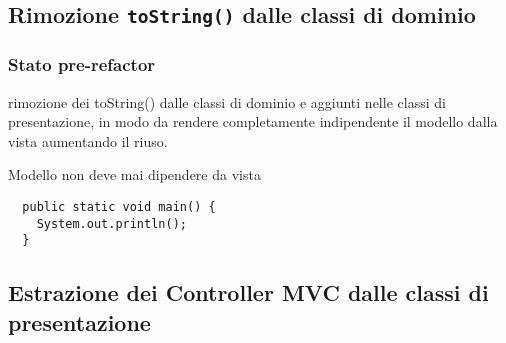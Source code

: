 
\subsection{Rimozione \texttt{toString()} dalle classi di dominio}
\begin{frame}[fragile]
  \frametitle{Stato pre-refactor}
  rimozione dei toString() dalle classi di dominio e aggiunti nelle classi di presentazione, in modo da
  rendere completamente indipendente il modello dalla vista aumentando il riuso.\par
  Modello non deve mai dipendere da vista
  \begin{lstlisting}
  public static void main() {
    System.out.println();
  }
  \end{lstlisting}
\end{frame}

\subsection{Estrazione dei Controller MVC dalle classi di presentazione}
